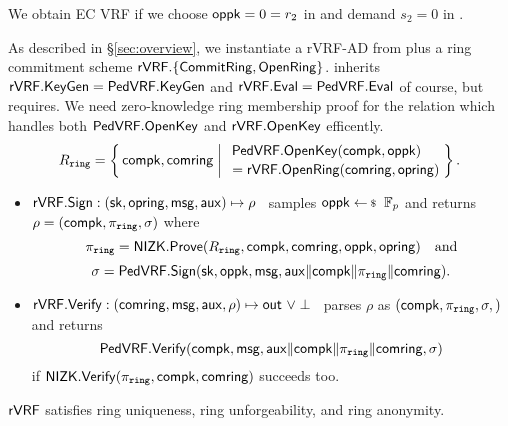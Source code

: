 \noindent We obtain EC VRF if we choose $\mathsf{oppk} = 0 = r_2$ in \Sign and demand $s_2 = 0$ in \Verify.
%

\smallskip

As described in \S\ref{sec:overview},
we instantiate a rVRF-AD from \PedVRF plus a ring commitment scheme
 ${\mathsf{rVRF}}.\{ {\mathsf{CommitRing}}, {\mathsf{OpenRing}} \}$.
\rVRF inherits ${\mathsf{rVRF}}.{\mathsf{KeyGen}} = {\mathsf{PedVRF}}.{\mathsf{KeyGen}}$ and
 ${\mathsf{rVRF}}.{\mathsf{Eval}} = {\mathsf{PedVRF}}.{\mathsf{Eval}}$ of course, but requires.
We need zero-knowledge ring membership proof for the relation \Rring
which handles both ${\mathsf{PedVRF}}.{\mathsf{OpenKey}}$ and ${\mathsf{rVRF}}.{\mathsf{OpenKey}}$ efficently.
$$ \Rring = \Setst{ \compk, \comring }{
    \eprint{ \exists \openpk,\openring \textrm{\ s.t.\ } }{}
    \genfrac{}{}{0pt}{}{\PedVRF.\OpenKey(\compk,\openpk) \quad}{\,\, = \rVRF.\OpenRing(\comring,\openring)}
} \mathperiod $$

\begin{itemize}
\item ${\mathsf{rVRF}}.{\mathsf{Sign}} : (\mathsf{sk},\mathsf{opring},\mathsf{msg},\mathsf{aux}) \mapsto \rho$ \,
 samples $\openpk \leftsample \F_p$ and
 returns $\rho = (\mathsf{compk},\pi_{\mathtt{ring}},\sigma)$ where      %
 $$ \pi_{\mathtt{ring}} = {\mathsf{NIZK}}.{\mathsf{Prove}}(R_{\mathtt{ring}},\mathsf{compk},\mathsf{comring},\mathsf{oppk},\mathsf{opring}) \quad\textrm{and} $$
 $$ \sigma = {\mathsf{PedVRF}}.{\mathsf{Sign}}(\mathsf{sk},\mathsf{oppk},\mathsf{msg},\mathsf{aux} \| \mathsf{compk} \| \pi_{\mathtt{ring}} \| \mathsf{comring}) . $$ %
\item ${\mathsf{rVRF}}.{\mathsf{Verify}} : (\mathsf{comring},\mathsf{msg},\mathsf{aux},\rho) \mapsto {\ensuremath{\mathsf{out}}} \,\, \lor \perp$ \,
 parses $\rho$ as $(\mathsf{compk},\pi_{\mathtt{ring}},\sigma,)$ and returns
 $$ {\mathsf{PedVRF}}.{\mathsf{Verify}}(\mathsf{compk},\mathsf{msg},\mathsf{aux} \| \mathsf{compk} \| \pi_{\mathtt{ring}} \| \mathsf{comring},\sigma) $$
 if ${\mathsf{NIZK}}.{\mathsf{Verify}}(\pi_{\mathtt{ring}},\mathsf{compk},\mathsf{comring})$ succeeds too.
\end{itemize}

\begin{proposition}\label{prop:pedersen_rvrf}
${\mathsf{rVRF}}$ satisfies ring uniqueness, ring unforgeability, and ring anonymity.
\end{proposition}






